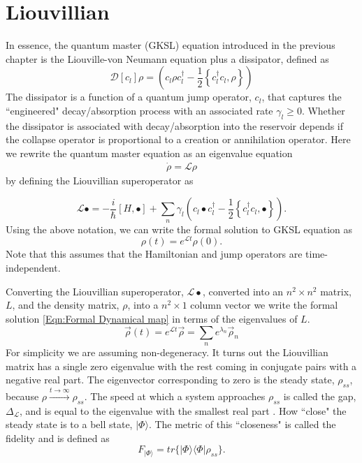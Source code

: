 \section{Liouvillian}
%
In essence, the quantum master (GKSL) equation introduced in the previous chapter is the Liouville-von Neumann equation plus a dissipator, defined as
%
\begin{equation}
\mathcal{D}[c_l] \rho = \left( c_l \rho c_l^\dagger - \frac{1}{2} \left\lbrace c_l^\dagger c_l , \rho \right\rbrace \right)
\end{equation}
%
The dissipator is a function of a quantum jump operator, $c_l$, that captures the ``engineered" decay/absorption process with an associated rate $\gamma_l \geq 0$. Whether the dissipator is associated with decay/absorption into the reservoir depends if the collapse operator is proportional to a creation or annihilation operator. Here we rewrite the quantum master equation as an eigenvalue equation 
%
\begin{eqnarray}
\dot{\rho} = \mathcal{L}\rho
\end{eqnarray}
%
by defining the Liouvillian superoperator as

\begin{equation}
\mathcal{L}\bullet = - \frac{i}{\hbar} [ H , \bullet ] + \sum_n \gamma_l \left( c_l \bullet c_l^\dagger - \frac{1}{2} \left\lbrace c_l^\dagger c_l , \bullet \right\rbrace \right).
\end{equation}
%
Using the above notation, we can write the formal solution to GKSL equation as
%
\begin{equation}\label{Eqn:Formal Dynamical map}
\rho(t) = e^{\mathcal{L}t } \rho(0).
\end{equation}
%
Note that this assumes that the Hamiltonian and jump operators are time-independent.
%
\par
%
Converting the Liouvillian superoperator, $\mathcal{L} \bullet$, converted into an $n^2 \times n^2 $ matrix, $L$, and the density matrix, $\rho$, into a $n^2 \times 1$ column vector we write the formal solution \ref{Eqn:Formal Dynamical map} in terms of the eigenvalues of $L$.
\begin{equation}
\vec{\rho}(t) = e^{\mathcal{L}t} \vec{\rho} =  \sum_n e^{\lambda_n} \vec{\rho}_n
\end{equation}
For simplicity we are assuming non-degeneracy. It turns out the Liouvillian matrix has a single zero eigenvalue with the rest coming in conjugate pairs with a negative real part. The eigenvector corresponding to zero is the steady state, $\rho_{ss}$, because $\rho \xrightarrow{t\rightarrow\infty} \rho_{ss}$. The speed at which a system approaches $\rho_{ss}$ is called the gap, $\Delta_\mathcal{L}$, and is equal to the eigenvalue with the smallest real part \cite{KrausTheorems}. How ``close" the steady state is to a bell state, $| \Phi \rangle$. The metric of this ``closeness" is called the fidelity and is defined as 
\begin{equation}
F_{| \Phi \rangle} = tr \lbrace | \Phi \rangle \langle \Phi |  \rho_{ss} \rbrace.
\end{equation}

